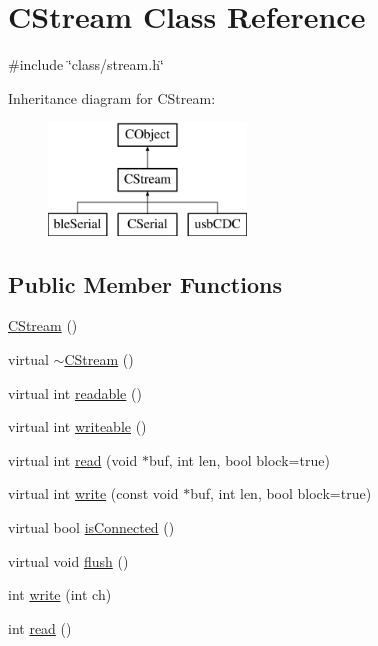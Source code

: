 \hypertarget{class_c_stream}{\section{C\-Stream Class Reference}
\label{class_c_stream}
}


{\ttfamily \#include \char`\"{}class/stream.\-h\char`\"{}}

Inheritance diagram for C\-Stream\-:\begin{figure}[H]
\begin{center}
\leavevmode
\includegraphics[height=3.000000cm]{d4/d16/class_c_stream}
\end{center}
\end{figure}
\subsection*{Public Member Functions}
\begin{DoxyCompactItemize}
\item 
\hyperlink{class_c_stream_acd9fd6c1ed458608829da8288047515c}{C\-Stream} ()
\item 
virtual \hyperlink{class_c_stream_ab1387be186f7dd1877455ea246b56d5e}{$\sim$\-C\-Stream} ()
\item 
virtual int \hyperlink{class_c_stream_a96328807241e15017868b845b06fd9e4}{readable} ()
\item 
virtual int \hyperlink{class_c_stream_a56ec27ee664f1a4eb9910988b78833d5}{writeable} ()
\item 
virtual int \hyperlink{class_c_stream_a80977482ffb2f7b626a9f29f437b7d8d}{read} (void $\ast$buf, int len, bool block=true)
\item 
virtual int \hyperlink{class_c_stream_a172fe857c74488b881007c65cc2e9552}{write} (const void $\ast$buf, int len, bool block=true)
\item 
virtual bool \hyperlink{class_c_stream_a7a152e6bda8654064634428d81bd81cb}{is\-Connected} ()
\item 
virtual void \hyperlink{class_c_stream_a5bd707b33627e01c2069b14bbf10694a}{flush} ()
\item 
int \hyperlink{class_c_stream_aa5c2d9723e67ba97a65a890f0b55656f}{write} (int ch)
\item 
int \hyperlink{class_c_stream_a59d24a785259d0f0aa3f8f44a1046fd7}{read} ()
\end{DoxyCompactItemize}


